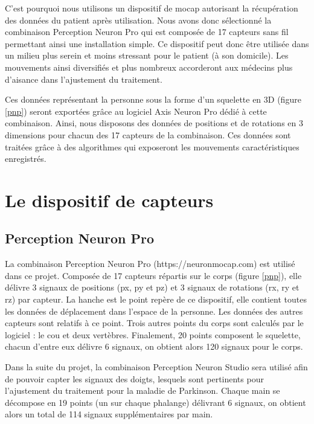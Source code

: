 \documentclass{article}
\begin{document}
C'est pourquoi nous utilisons un dispositif de \acrshort{mocap} autorisant la récupération des données du patient après utilisation. Nous avons donc sélectionné la combinaison Perception Neuron Pro qui est composée de 17 capteurs sans fil permettant ainsi une installation simple. Ce dispositif peut donc être utilisée dans un milieu plus serein et moins stressant pour le patient (à son domicile). Les mouvements ainsi diversifiés et plus nombreux accorderont aux médecins plus d'aisance dans l'ajustement du traitement.

Ces données représentant la personne sous la forme d'un squelette en 3D (figure \ref{pnp}) seront exportées grâce au logiciel Axis Neuron Pro dédié à cette combinaison. Ainsi, nous disposons des données de positions et de rotations en 3 dimensions pour chacun des 17 capteurs de la combinaison. Ces données sont traitées grâce à des algorithmes qui exposeront les mouvements caractéristiques enregistrés.

\section{Le dispositif de capteurs}

\subsection{Perception Neuron Pro}

La combinaison Perception Neuron Pro (https://neuronmocap.com) est utilisé dans ce projet. Composée de 17 capteurs répartis sur le corps (figure \ref{pnp}), elle délivre 3 signaux de positions (px, py et pz) et 3 signaux de rotations (rx, ry et rz) par capteur. La hanche est le point repère de ce dispositif, elle contient toutes les données de déplacement dans l'espace de la personne. Les données des autres capteurs sont relatifs à ce point. Trois autres points du corps sont calculés par le logiciel : le cou et deux vertèbres. Finalement, 20 points composent le squelette, chacun d'entre eux délivre 6 signaux, on obtient alors 120 signaux pour le corps.

Dans la suite du projet, la combinaison Perception Neuron Studio sera utilisé afin de pouvoir capter les signaux des doigts, lesquels sont pertinents pour l'ajustement du traitement pour la maladie de Parkinson. Chaque main se décompose en 19 points (un sur chaque phalange) délivrant 6 signaux, on obtient alors un total de 114 signaux supplémentaires par main.
\end{document}
